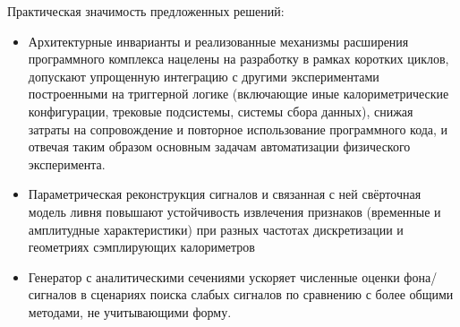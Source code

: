 Практическая значимость предложенных решений:

\begin{itemize}
    \item Архитектурные инварианты и реализованные механизмы
    расширения программного комплекса нацелены на разработку
    в рамках коротких циклов, допускают упрощенную интеграцию с
    другими экспериментами построенными на триггерной логике (включающие
    иные калориметрические конфигурации, трековые подсистемы,
    системы сбора данных), снижая затраты на сопровождение
    и повторное использование программного кода, и отвечая таким образом
    основным задачам автоматизации физического эксперимента.
    \item Параметрическая реконструкция сигналов и связанная с ней
    свёрточная модель ливня повышают устойчивость извлечения
    признаков (временные и амплитудные характеристики)
    при разных частотах дискретизации и геометриях
    сэмплирующих калориметров
    \item Генератор с аналитическими сечениями ускоряет
    численные оценки фона/сигналов в сценариях поиска слабых
    сигналов по сравнению с более общими методами, не
    учитывающими форму.
\end{itemize}



\begin{comment}
\paragraph{Благодарности}

Автор выражает благодарность научному руководителю
диссертационной работы профессору Валерию Ефимовичу Любовицкому
за знакомство с научным процессом современной физики высоких
энергий и обширную теоретическую перспективу. Автор глубоко
признателен руководителю эксперимента NA64 Сергею Николаевичу
Гниненко за предоставленные возможности и проницательные
комментарии о постановке эксперимента.
Михаила Михайловича Кирсанова за поддержку и наставления.
Автор благодарит Алексея Эдуардовича Шевелёва за неоценимую помощь
в реализации модулей реконструкции треков и тестировании всего
программного окружения. Сергея Герасимова за тестирование и ценные
комментарии об обобщённой реализации алгоритма CATS применительно
к модельным данным Belle II, Миральда Тузи (Mirald Tuzi) и
Генри Зибера (Dr. Henri Hugo Sieber) за тестирование реализации алгоритма
CATS в NA64. Решающий вклад в практическое тестирование, интеграцию и отладку
параметров реконструкции сигналов сэмплирующих преобразователей применительно
к физическим задачам внесли Андреа Челентано
(Dr. Andrea Celentano) и Лука Марсикано (Dr. Luca Marsicano).
\end{comment}